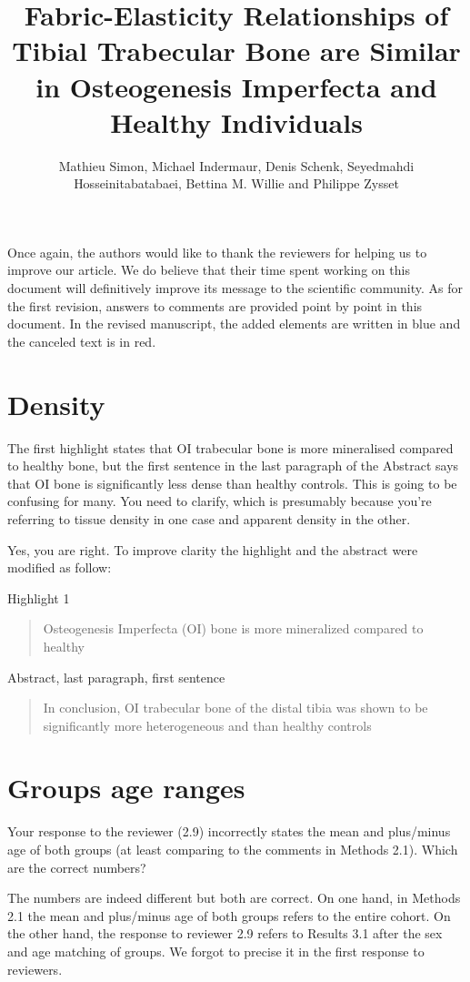 \documentclass{AR2RC}
\title{Fabric-Elasticity Relationships of Tibial Trabecular Bone are Similar in Osteogenesis Imperfecta and Healthy Individuals}
\author{Mathieu Simon, Michael Indermaur, Denis Schenk, Seyedmahdi Hosseinitabatabaei, Bettina	M. Willie and Philippe Zysset}
\begin{document}
\maketitle

\vspace{1em}Once again, the authors would like to thank the reviewers for helping us to improve our article. We do believe that their time spent working on this document will definitively improve its message to the scientific community. As for the first revision, answers to comments are provided point by point in this document. In the revised manuscript, the added elements are written in blue and the canceled text is in red.

\section{Density}
\RC The first highlight states that OI trabecular bone is more mineralised compared to healthy bone, but the first sentence in the last paragraph of the Abstract says that OI bone is significantly less dense than healthy controls. This is going to be confusing for many. You need to clarify, which is presumably because you’re referring to tissue density in one case and apparent density in the other.

\AR Yes, you are right. To improve clarity the highlight and the abstract were modified as follow:

Highlight 1
\begin{quote}
	Osteogenesis Imperfecta (OI)  bone  is more mineralized compared to healthy
\end{quote} 

Abstract, last paragraph, first sentence
\begin{quote}
	In conclusion, OI trabecular bone of the distal tibia was shown to be significantly more heterogeneous and   than healthy controls
\end{quote} 

\section{Groups age ranges}
\RC Your response to the reviewer (2.9) incorrectly states the mean and plus/minus age of both groups (at least comparing to the comments in Methods 2.1). Which are the correct numbers?

\AR The numbers are indeed different but both are correct. On one hand, in Methods 2.1 the mean and plus/minus age of both groups refers to the entire cohort. On the other hand, the response to reviewer 2.9 refers to Results 3.1 after the sex and age matching of groups. We forgot to precise it in the first response to reviewers.
\end{document}
